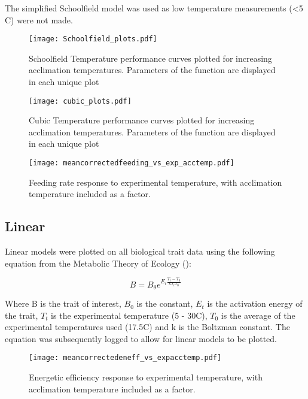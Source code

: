 \documentclass[../../Paper.tex]{subfiles}
\begin{document}
The simplified Schoolfield model was used
as low temperature measurements (\textless 5 \degree C) were not made. 


\begin{figure*}[!t]
\centering
\texttt{[image: Schoolfield\_plots.pdf]}
\caption{Schoolfield Temperature performance curves plotted for increasing 
acclimation temperatures. Parameters of the function are displayed in each 
unique plot}
\end{figure*}

\begin{figure*}[!t]
\centering
\texttt{[image: cubic\_plots.pdf]}
\caption{Cubic Temperature performance curves plotted for increasing 
acclimation temperatures. Parameters of the function are displayed in each 
unique plot}
\end{figure*}

\begin{figure*}[!b]

\centering
\texttt{[image: meancorrectedfeeding\_vs\_exp\_acctemp.pdf]}
\caption{Feeding rate response to experimental temperature, with    
acclimation temperature included as a factor.}
\end{figure*}

\subsection*{Linear}

Linear models were plotted on all biological trait data using 
the following equation from the Metabolic Theory of Ecology 
(\cite{gillooly_effects_2001,savage_effects_2004}):

\begin{equation}
B = B_{\theta} e^{E_t\frac{T_t - T_0}{kT_tT_0}}
\end{equation}

Where B is the trait of interest, $B_0$ is the constant, $E_t$ is the 
activation energy of the trait, $T_t$ is the experimental temperature (5 - 
30\degree C), $T_0$ is the average of the experimental temperatures used (17.5\degree C) and k is the Boltzman constant. The equation was subsequently logged to allow for linear models to be plotted.


\begin{figure*}[!b]

\centering
\texttt{[image: meancorrectedeneff\_vs\_expacctemp.pdf]}
\caption{Energetic efficiency response to experimental temperature, with    
acclimation temperature included as a factor.}
\end{figure*}
\end{document}
